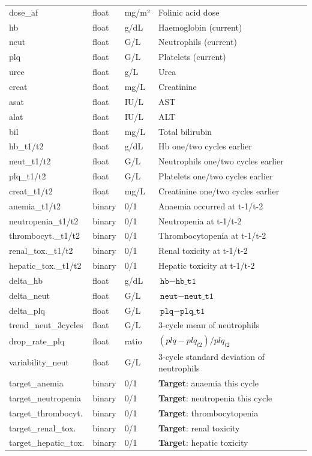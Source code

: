 \documentclass[12pt,a4paper]{report}
\begin{document}
\begin{longtable}{p{3.5cm}p{1.5cm}p{2.5cm}p{5.5cm}}
dose\_af & float & mg/m² & Folinic acid dose \\
hb & float & g/dL & Haemoglobin (current) \\
neut & float & G/L & Neutrophils (current) \\
plq & float & G/L & Platelets (current) \\
uree & float & g/L & Urea \\
creat & float & mg/L & Creatinine \\
asat & float & IU/L & AST \\
alat & float & IU/L & ALT \\
bil & float & mg/L & Total bilirubin \\
hb\_t1/t2 & float & g/dL & Hb one/two cycles earlier \\
neut\_t1/t2 & float & G/L & Neutrophils one/two cycles earlier \\
plq\_t1/t2 & float & G/L & Platelets one/two cycles earlier \\
creat\_t1/t2 & float & mg/L & Creatinine one/two cycles earlier \\
anemia\_t1/t2 & binary & 0/1 & Anaemia occurred at t-1/t-2 \\
neutropenia\_t1/t2 & binary & 0/1 & Neutropenia at t-1/t-2 \\
thrombocyt.\_t1/t2 & binary & 0/1 & Thrombocytopenia at t-1/t-2 \\
renal\_tox.\_t1/t2 & binary & 0/1 & Renal toxicity at t-1/t-2 \\
hepatic\_tox.\_t1/t2 & binary & 0/1 & Hepatic toxicity at t-1/t-2 \\
delta\_hb & float & g/dL & $\texttt{hb} - \texttt{hb\_t1}$ \\
delta\_neut & float & G/L & $\texttt{neut} - \texttt{neut\_t1}$ \\
delta\_plq & float & G/L & $\texttt{plq} - \texttt{plq\_t1}$ \\
trend\_neut\_3cycles & float & G/L & 3-cycle mean of neutrophils \\
drop\_rate\_plq & float & ratio & $(plq - plq_{t2}) / plq_{t2}$ \\
variability\_neut & float & G/L & 3-cycle standard deviation of neutrophils \\
target\_anemia & binary & 0/1 & \textbf{Target}: anaemia this cycle \\
target\_neutropenia & binary & 0/1 & \textbf{Target}: neutropenia this cycle \\
target\_thrombocyt. & binary & 0/1 & \textbf{Target}: thrombocytopenia \\
target\_renal\_tox. & binary & 0/1 & \textbf{Target}: renal toxicity \\
target\_hepatic\_tox. & binary & 0/1 & \textbf{Target}: hepatic toxicity \\
\end{longtable}
\end{document}
